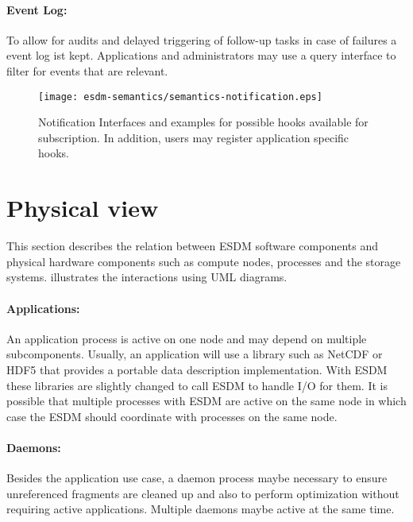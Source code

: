 \paragraph{Event Log:}
To allow for audits and delayed triggering of follow-up tasks in case of failures a event log ist kept.
Applications and administrators may use a query interface to filter for events that are relevant.


\begin{figure}
	\centering
	\texttt{[image: esdm-semantics/semantics-notification.eps]}
	\caption{Notification Interfaces and examples for possible hooks available for subscription. In addition, users may register application specific hooks.}
	\label{fig:semantic notification}
\end{figure}









\section{Physical view}
\label{sec: viewpoints/physical}

This section describes the relation between ESDM software components and physical hardware components such as  compute nodes, processes and the storage systems.
 illustrates the interactions using UML diagrams.

\paragraph{Applications:} An application process is active on one node and may depend on multiple subcomponents.
Usually, an application will use a library such as NetCDF or HDF5 that provides a portable data description implementation.
With ESDM these libraries are slightly changed to call ESDM to handle I/O for them.
It is possible that multiple processes with ESDM are active on the same node in which case the ESDM should coordinate with processes on the same node.

\paragraph{Daemons:} Besides the application use case, a daemon process maybe necessary to ensure unreferenced fragments are cleaned up and also to perform optimization without requiring active applications.
Multiple daemons maybe active at the same time.


